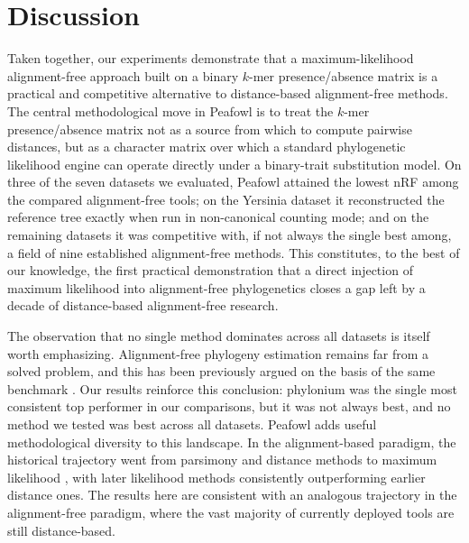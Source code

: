 \documentclass[11pt]{article}
\begin{document}
\section{Discussion}

Taken together, our experiments demonstrate that a maximum-likelihood
alignment-free approach built on a binary $k$-mer presence/absence matrix
is a practical and competitive alternative to distance-based alignment-free
methods. The central methodological move in Peafowl is to treat the $k$-mer
presence/absence matrix not as a source from which to compute pairwise
distances, but as a character matrix over which a standard phylogenetic
likelihood engine \citep{stamatakis2014raxml} can operate directly under a
binary-trait substitution model. On three of the seven datasets we
evaluated, Peafowl attained the lowest nRF among the compared alignment-free
tools; on the Yersinia dataset it reconstructed the reference tree exactly
when run in non-canonical counting mode; and on the remaining datasets it
was competitive with, if not always the single best among, a field of nine
established alignment-free methods. This constitutes, to the best of our
knowledge, the first practical demonstration that a direct injection of
maximum likelihood into alignment-free phylogenetics closes a gap left by
a decade of distance-based alignment-free research.

The observation that no single method dominates across all datasets is
itself worth emphasizing. Alignment-free phylogeny estimation remains far
from a solved problem, and this has been previously argued on the basis of
the same benchmark \citep{zielezinski2019afproject}. Our results reinforce
this conclusion: phylonium was the single most consistent top performer in
our comparisons, but it was not always best, and no method we tested was
best across all datasets. Peafowl adds useful methodological diversity to
this landscape. In the alignment-based paradigm, the historical trajectory
went from parsimony \citep{fitch1971parsimony} and distance methods
\citep{saitou1987nj} to maximum likelihood
\citep{felsenstein1981ml, posada2021felsenstein}, with later likelihood
methods consistently outperforming earlier distance ones. The results here
are consistent with an analogous trajectory in the alignment-free paradigm,
where the vast majority of currently deployed tools are still distance-based.
\end{document}
